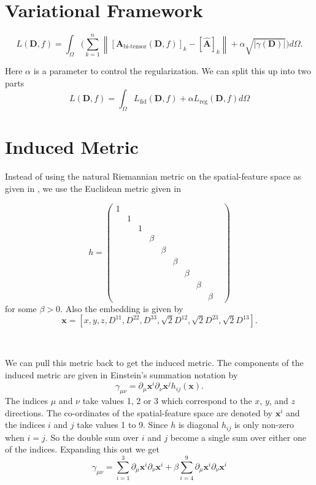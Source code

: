 \documentclass[12pt]{article}
\newcommand{\vect}[1]{\mathbf{#1}}
\newcommand{\Abitensor}{\vect{A}_{\text{bi-tensor}}}
\begin{document}
\section{Variational Framework}


$$L(\vect{D}, f) = \int_\Omega \bigg( \sum_{k=1}^n
\left\lVert[\Abitensor(\vect{D}, f)]_k - 
[\hat{\vect{A}}]_k \right\rVert
+ \alpha \sqrt{|\gamma(\vect{D})|} \bigg) d\Omega.$$ 

\noindent
Here $\alpha$ is a parameter to control the regularization. We can split this up into two parts $$L(\vect{D}, f) = \int_\Omega L_{\text{fid}} (\vect{D}, f) + \alpha L_{\text{reg}}(\vect{D}, f) d\Omega $$


\section{Induced Metric}

Instead of using the natural Riemannian metric on the spatial-feature space as
given in \cite{Pasternak2009}, we use the Euclidean metric given in
\cite{Pasternak2014} 

$$
h = 
\begin{pmatrix}
1 & & & & & & & & \\
 & 1 & & & & & & & \\
 & & 1 & & & & & & \\
 & & & \beta & & & & & \\
 & & & & \beta & & & & \\
 & & & & & \beta & & & \\
 & & & & & & \beta & & \\
 & & & & & & & \beta & \\
 & & & & & & & & \beta & 
\end{pmatrix}
$$
for some $\beta > 0$. Also the embedding is given by 
$$ \vect{x} = [x, y, z, D^{1 1}, D^{2 2}, D^{3 3}, \sqrt{2} D^{1 2}, \sqrt{2}
D^{2 3}, \sqrt{2} D^{1 3}].$$


\ 

\noindent
We can pull this metric back to get the induced metric. The components of the
induced metric are given in Einstein's summation notation by $$ \gamma_{\mu
\nu} = \partial_\mu \vect{x}^i \partial_\nu \vect{x}^j h_{ij}(\vect{x}).$$ The
indices $\mu$ and $\nu$ take values 1, 2 or 3 which correspond to the $x$, $y$,
and $z$ directions. The co-ordinates of the spatial-feature space are denoted
by $\vect{x}^i$ and the indices $i$ and $j$ take values 1 to 9.  Since $h$ is
diagonal $h_{i j}$ is only non-zero when $i = j$. So the double sum over $i$
and $j$ become a single sum over either one of the indices.  Expanding this out
we get 
$$\gamma_{\mu \nu} = 
\sum_{i=1}^3 \partial_\mu \vect{x}^i \partial_\nu \vect{x}^i + 
\beta \sum_{i=4}^9 \partial_\mu \vect{x}^i \partial_\nu \vect{x}^i$$
\end{document}

